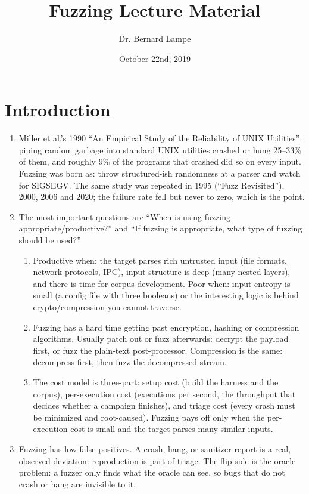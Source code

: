 \documentclass[12pt]{Training}
\title{Fuzzing Lecture Material}
\author{Dr. Bernard Lampe}
\date{October 22nd, 2019}
\begin{document}
\maketitle


\section*{Introduction}
\begin{enumerate}
    \item Miller et al.'s 1990 ``An Empirical Study of the Reliability of UNIX Utilities'': piping random garbage into standard UNIX utilities crashed or hung 25--33\% of them, and roughly 9\% of the programs that crashed did so on every input. Fuzzing was born as: throw structured-ish randomness at a parser and watch for SIGSEGV. The same study was repeated in 1995 (``Fuzz Revisited''), 2000, 2006 and 2020; the failure rate fell but never to zero, which is the point.
    \item The most important questions are ``When is using fuzzing appropriate/productive?'' and ``If fuzzing is appropriate, what type of fuzzing should be used?''
    \begin{enumerate}
        \item Productive when: the target parses rich untrusted input (file formats, network protocols, IPC), input structure is deep (many nested layers), and there is time for corpus development. Poor when: input entropy is small (a config file with three booleans) or the interesting logic is behind crypto/compression you cannot traverse.
        \item Fuzzing has a hard time getting past encryption, hashing or compression algorithms. Usually patch out or fuzz afterwards: decrypt the payload first, or fuzz the plain-text post-processor. Compression is the same: decompress first, then fuzz the decompressed stream.
        \item The cost model is three-part: setup cost (build the harness and the corpus), per-execution cost (executions per second, the throughput that decides whether a campaign finishes), and triage cost (every crash must be minimized and root-caused). Fuzzing pays off only when the per-execution cost is small and the target parses many similar inputs.
    \end{enumerate}
    \item Fuzzing has low false positives. A crash, hang, or sanitizer report is a real, observed deviation: reproduction is part of triage. The flip side is the oracle problem: a fuzzer only finds what the oracle can see, so bugs that do not crash or hang are invisible to it.

\end{enumerate}
\end{document}
